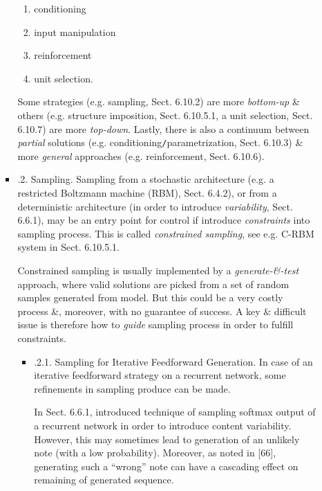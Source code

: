 \documentclass{article}
\begin{document}
\begin{itemize}
\begin{itemize}
\begin{itemize}
\begin{enumerate}
				\item conditioning
				\item input manipulation
				\item reinforcement
				\item unit selection.
			\end{enumerate}
			Some strategies (e.g. sampling, Sect. 6.10.2) are more {\it bottom-up} \& others (e.g. structure imposition, Sect. 6.10.5.1, a unit selection, Sect. 6.10.7) are more {\it top-down}. Lastly, there is also a continuum between {\it partial} solutions (e.g. conditioning{\tt/}parametrization, Sect. 6.10.3) \& more {\it general} approaches (e.g. reinforcement, Sect. 6.10.6).
			\item {.2. Sampling.} Sampling from a stochastic architecture (e.g. a restricted Boltzmann machine (RBM), Sect. 6.4.2), or from a deterministic architecture (in order to introduce {\it variability}, Sect. 6.6.1), may be an entry point for control if introduce {\it constraints} into sampling process. This is called {\it constrained sampling}, see e.g. C-RBM system in Sect. 6.10.5.1.
			
			Constrained sampling is usually implemented by a {\it generate-\&-test} approach, where valid solutions are picked from a set of random samples generated from model. But this could be a very costly process \&, moreover, with no guarantee of success. A key \& difficult issue is therefore how to {\it guide} sampling process in order to fulfill constraints.
			\begin{itemize}
				\item {.2.1. Sampling for Iterative Feedforward Generation.} In case of an iterative feedforward strategy on a recurrent network, some refinements in sampling produce can be made.
				
				In Sect. 6.6.1, introduced technique of sampling softmax output of a recurrent network in order to introduce content variability. However, this may sometimes lead to generation of an unlikely note (with a low probability). Moreover, as noted in [66], generating such a ``wrong'' note can have a cascading effect on remaining of generated sequence.
				

\end{itemize}
\end{itemize}
\end{itemize}
\end{itemize}
\end{document}
